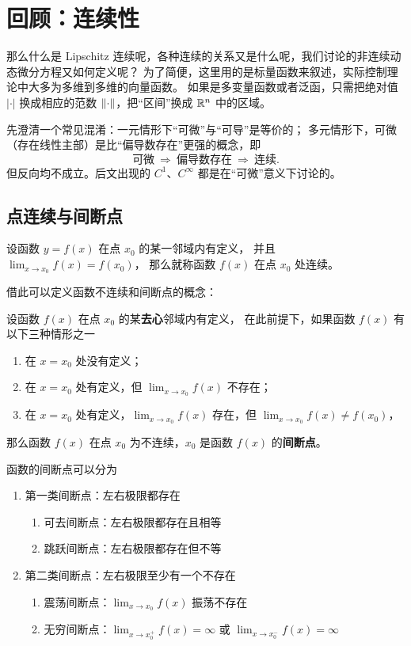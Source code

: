 \section{回顾：连续性}\label{sec:continuity}

那么什么是 Lipschitz 连续呢，各种连续的关系又是什么呢，我们讨论的非连续动态微分方程又如何定义呢？
为了简便，这里用的是标量函数来叙述，实际控制理论中大多为多维到多维的向量函数。
如果是多变量函数或者泛函，只需把绝对值 $|\cdot|$ 换成相应的范数 $\left\lVert\cdot\right\rVert$，把“区间”换成 $\mathbb{R}^n$ 中的区域。

先澄清一个常见混淆：一元情形下“可微”与“可导”是等价的；
多元情形下，可微（存在线性主部）是比“偏导数存在”更强的概念，即
\[
\text{可微}\ \Longrightarrow\ \text{偏导数存在}\ \Longrightarrow\ \text{连续}.
\]
但反向均不成立。后文出现的 $C^1$、$C^\infty$ 都是在“可微”意义下讨论的。

\subsection{点连续与间断点}\label{subsec:continuity-points}

\begin{definition}[点连续]
设函数 $y=f(x)$ 在点 $x_0$ 的某一邻域内有定义，
并且 $\lim_{x\to x_0}f(x)=f(x_0)$，
那么就称函数 $f(x)$ 在点 $x_0$ 处连续。
\end{definition}

借此可以定义函数不连续和间断点的概念：
\begin{definition}[间断点]
设函数 $f(x)$ 在点 $x_0$ 的某\textbf{去心}邻域内有定义，
在此前提下，如果函数 $f(x)$ 有以下三种情形之一
\begin{enumerate}
  \item 在 $x=x_0$ 处没有定义；
  \item 在 $x=x_0$ 处有定义，但 $\lim_{x\to x_0} f(x)$ 不存在；
  \item 在 $x=x_0$ 处有定义，$\lim_{x\to x_0} f(x)$ 存在，但 $\lim_{x\to x_0}f(x)\neq f(x_0)$，
\end{enumerate}
那么函数 $f(x)$ 在点 $x_0$ 为不连续，$x_0$ 是函数 $f(x)$ 的\textbf{间断点}。
\end{definition}

函数的间断点可以分为
\begin{enumerate}
  \item 第一类间断点：左右极限都存在
  \begin{enumerate}
    \item 可去间断点：左右极限都存在且相等
    \item 跳跃间断点：左右极限都存在但不等
  \end{enumerate}
  \item 第二类间断点：左右极限至少有一个不存在
  \begin{enumerate}
    \item 震荡间断点：$\lim_{x\to x_0} f(x)$ 振荡不存在
    \item 无穷间断点：$\lim_{x\to x_0^+} f(x)=\infty$ 或 $\lim_{x\to x_0^-} f(x)=\infty$
  \end{enumerate}
\end{enumerate}

